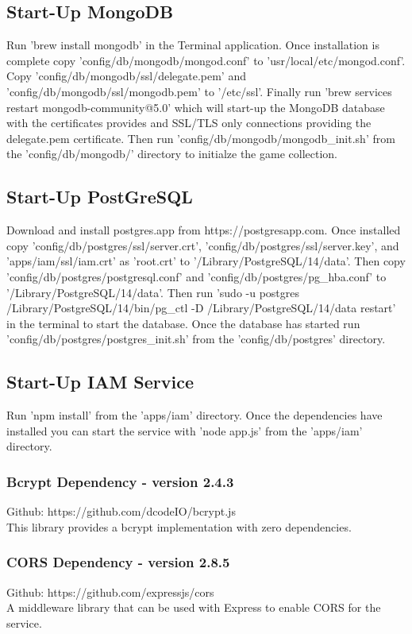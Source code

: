 \documentclass[12pt]{article}
\begin{document}
\subsection{Start-Up MongoDB} 
Run 'brew install mongodb' in the Terminal application. Once installation is complete copy 'config/db/mongodb/mongod.conf' to 'usr/local/etc/mongod.conf'. Copy 'config/db/mongodb/ssl/delegate.pem' and 'config/db/mongodb/ssl/mongodb.pem' to '/etc/ssl'. Finally run 'brew services restart mongodb-community@5.0' which will start-up the MongoDB database with the certificates provides and SSL/TLS only connections providing the delegate.pem certificate. Then run 'config/db/mongodb/mongodb\_init.sh' from the 'config/db/mongodb/' directory to initialze the game collection.

\subsection{Start-Up PostGreSQL} 
Download and install postgres.app from https://postgresapp.com. Once installed copy 'config/db/postgres/ssl/server.crt', 'config/db/postgres/ssl/server.key', and 'apps/iam/ssl/iam.crt' as 'root.crt' to '/Library/PostgreSQL/14/data'. Then copy 'config/db/postgres/postgresql.conf' and 'config/db/postgres/pg\_hba.conf' to '/Library/PostgreSQL/14/data'. Then run 'sudo -u postgres /Library/PostgreSQL/14/bin/pg\_ctl -D /Library/PostgreSQL/14/data restart' in the terminal to start the database. Once the database has started run 'config/db/postgres/postgres\_init.sh' from the 'config/db/postgres' directory.


\subsection{Start-Up IAM Service} 
Run 'npm install' from the 'apps/iam' directory. Once the dependencies have installed you can start the service with 'node app.js' from the 'apps/iam' directory.

\subsubsection{Bcrypt Dependency - version 2.4.3}
Github: https://github.com/dcodeIO/bcrypt.js\\
This library provides a bcrypt implementation with zero dependencies.

\subsubsection{CORS Dependency - version 2.8.5}
Github: https://github.com/expressjs/cors\\
A middleware library that can be used with Express to enable CORS for the service.
\end{document}
